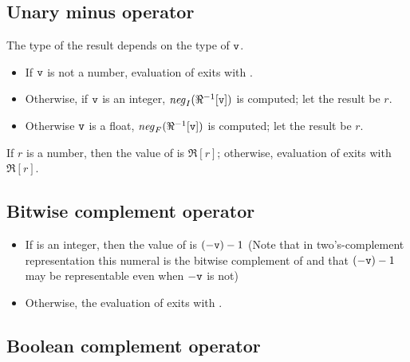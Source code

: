 \subsection{Unary minus operator \T{-}}

\label{section:unaryminus}

The type of the result depends on the type of ${\tt{\sl v}}$.
\begin{itemize}
\item If ${\tt{\sl v}}$ is not a number,
evaluation of  exits with .
\item Otherwise, if ${\tt{\sl v}}$ is an integer,
$\mathit{neg}_I(\Re^{-1}[{\tt{\sl v}}])$ is computed; let the result be $r$.
\item Otherwise ${\tt{\sl v}}$ is a float,
$\mathit{neg}_F(\Re^{-1}[{\tt{\sl v}}])$ is computed; let the result be $r$.
\end{itemize}
If $r$ is a number, then the value of  is $\Re[r]$;
otherwise, evaluation of  exits with $\Re[r]$.

\subsection{Bitwise complement operator }

\label{section:bitwisecomp}

\begin{itemize}
\item If  is an integer, then the value of  is $(-{\tt{\sl v}})-1$
(Note that in two's-com\-ple\-ment representation this numeral is the bitwise
complement of  and that $(-{\tt{\sl v}})-1$ may be representable even when $-{\tt{\sl v}}$ is not)
\item Otherwise, the evaluation of  exits with \T{\badarith}.
\end{itemize}

\subsection{Boolean complement operator }

